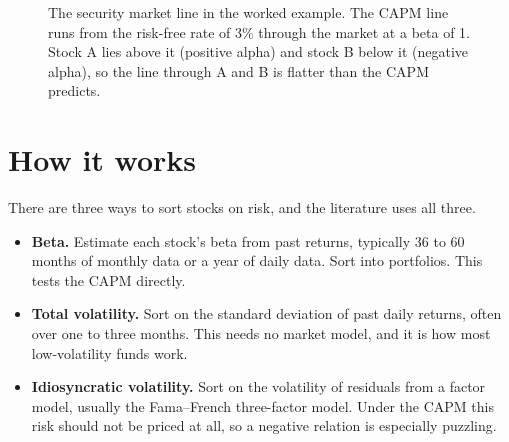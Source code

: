 \begin{figure}[htbp]
\centering
{}
\caption{The security market line in the worked example. The CAPM line runs from the risk-free rate of 3\% through the market at a beta of 1. Stock A lies above it (positive alpha) and stock B below it (negative alpha), so the line through A and B is flatter than the CAPM predicts.}
\label{fig:05-sml}
\end{figure}

\section{How it works}
\label{sec:05-how}

There are three ways to sort stocks on risk, and the literature uses all three.

\begin{itemize}
  \item \textbf{Beta.} Estimate each stock's beta from past returns, typically 36 to 60 months of monthly data or a year of daily data. Sort into portfolios. This tests the CAPM directly.
  \item \textbf{Total volatility.} Sort on the standard deviation of past daily returns, often over one to three months. This needs no market model, and it is how most low-volatility funds work.
  \item \textbf{Idiosyncratic volatility.} Sort on the volatility of residuals from a factor model, usually the Fama--French three-factor model. Under the CAPM this risk should not be priced at all, so a negative relation is especially puzzling.
\end{itemize}

